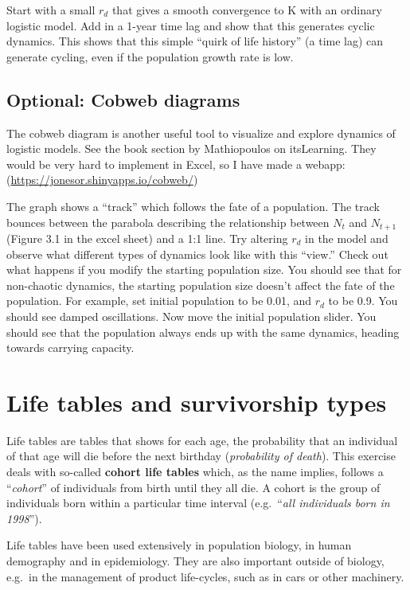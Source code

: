 \documentclass[
  a4paper]{book}
\begin{document}
Start with a small \(r_d\) that gives a smooth convergence to K with an
ordinary logistic model. Add in a 1-year time lag and show that this
generates cyclic dynamics. This shows that this simple ``quirk of life
history'' (a time lag) can generate cycling, even if the population
growth rate is low.

\hypertarget{optional-cobweb-diagrams}{%
\section{Optional: Cobweb diagrams}\label{optional-cobweb-diagrams}}

The cobweb diagram is another useful tool to visualize and explore
dynamics of logistic models. See the book section by Mathiopoulos on
itsLearning. They would be very hard to implement in Excel, so I have
made a webapp: (\url{https://jonesor.shinyapps.io/cobweb/})

The graph shows a ``track'' which follows the fate of a population. The
track bounces between the parabola describing the relationship between
\(N_t\) and \(N_{t+1}\) (Figure 3.1 in the excel sheet) and a 1:1 line.
Try altering \(r_d\) in the model and observe what different types of
dynamics look like with this ``view.'' Check out what happens if you
modify the starting population size. You should see that for non-chaotic
dynamics, the starting population size doesn't affect the fate of the
population. For example, set initial population to be 0.01, and \(r_d\)
to be 0.9. You should see damped oscillations. Now move the initial
population slider. You should see that the population always ends up
with the same dynamics, heading towards carrying capacity.

\hypertarget{life-tables-and-survivorship-types}{%
\chapter{Life tables and survivorship
types}\label{life-tables-and-survivorship-types}}

Life tables are tables that shows for each age, the probability that an
individual of that age will die before the next birthday
(\emph{probability of death}). This exercise deals with so-called
\textbf{cohort life tables} which, as the name implies, follows a
``\emph{cohort}'' of individuals from birth until they all die. A cohort
is the group of individuals born within a particular time interval
(e.g.~``\emph{all individuals born in 1998}'').

Life tables have been used extensively in population biology, in human
demography and in epidemiology. They are also important outside of
biology, e.g.~in the management of product life-cycles, such as in cars
or other machinery.
\end{document}
